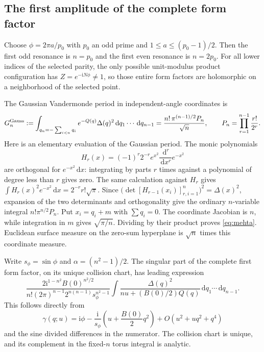 \documentclass[11pt]{article}
\numberwithin{equation}{section}
\theoremstyle{definition}
\newcommand{\dd}{\,\mathrm d}
\newcommand{\ii}{\mathrm i}
\begin{document}
\subsection{The first amplitude of the complete form factor}
Choose $\phi=2\pi a/p_0$ with $p_0$ an odd prime and
$1\le a\le(p_0-1)/2$. Then the first odd resonance is $n=p_0$ and
the first even resonance is $n=2p_0$. For all lower indices of the
selected parity, the only possible unit-modulus product configuration
has $Z=e^{-\ii N\phi}\ne1$, so those entire form factors are
holomorphic on a neighborhood of the selected point.

The Gaussian Vandermonde period in independent-angle coordinates
is
\begin{equation}\label{eq:mehta}
 G_n^{\rm Gauss}:=
 \int_{q_n=-\sum_{i<n}q_i}e^{-Q(q)}\Delta(q)^2
                         \dd q_1\cdots\dd q_{n-1}
 =\frac{n!\,\pi^{(n-1)/2}P_n}{\sqrt n},\qquad
 P_n=\prod_{r=1}^{n-1}\frac{r!}{2^r}.
\end{equation}
Here is an elementary evaluation of the Gaussian period. The monic
polynomials
\[
 H_r(x)=(-1)^r2^{-r}e^{x^2}\frac{\dd^r}{\dd x^r}e^{-x^2}
\]
are orthogonal for $e^{-x^2}\dd x$: integrating by parts $r$ times
against a polynomial of degree less than $r$ gives zero. The same
calculation against $H_r$ gives
$\int H_r(x)^2e^{-x^2}\dd x=2^{-r}r!\sqrt\pi$.
Since $\bigl(\det[H_{r-1}(x_i)]_{r,i=1}^n\bigr)^2=\Delta(x)^2$, expansion of
the two determinants and orthogonality give the ordinary
$n$-variable integral $n!\pi^{n/2}P_n$.
Put $x_i=q_i+m$ with $\sum q_i=0$. The coordinate Jacobian is $n$,
while integration in $m$ gives $\sqrt{\pi/n}$. Dividing by their
product proves \eqref{eq:mehta}. Euclidean surface measure on
the zero-sum hyperplane is $\sqrt n$ times this coordinate measure.

Write $s_\phi=\sin\phi$ and $\alpha=(n^2-1)/2$. The singular part
of the complete first form factor, on its unique collision chart, has
leading expression
\begin{equation}\label{eq:leadingintegral}
 \frac{2\ii^{1-n^2}B(0)^{n^2/2}}
 {n!(2\pi)^{n-1}2^{n(n-1)}s_\phi^{n^2-1}}
 \int\frac{\Delta(q)^2}{nu+(B(0)/2)Q(q)}
                                   \dd q_1\cdots\dd q_{n-1}.
\end{equation}
This follows directly from
\[
 \gamma(q;u)=\ii\phi-\frac{\ii}{s_\phi}
                  \left(u+\frac{B(0)}2q^2\right)
                  +O(u^2+u q^2+q^4)
\]
and the sine divided differences in the numerator. The collision
chart is unique, and its complement in the fixed-$n$ torus integral
is analytic.
\end{document}
